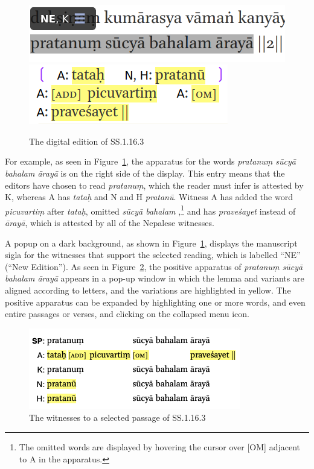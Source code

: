 \begin{figure}[t]
    \centering
    \includegraphics[draft=false,width=.5\textwidth]{media/SS.1.16.3c}
    \quad
    \includegraphics[draft=false,width=.35\textwidth]{media/SS.1.16.3d}
    \caption{The digital edition of SS.1.16.3}
    \label{SS.1.16}
\end{figure}
For example, as seen in Figure~\ref{SS.1.16}, the apparatus for the words 
\emph{pratanuṃ sūcyā bahalam ārayā} is on the right side of the display. 
This entry means that the editors have chosen to read 
\emph{pratanuṃ}, which the reader must infer is attested by K, whereas A has 
\emph{tataḥ} and N and H \emph{pratanū}. Witness A has added the word 
\emph{picuvartiṃ} after \emph{tataḥ}, omitted \emph{sūcyā bahalam },\footnote{The 
omitted words are displayed by hovering the cursor over [OM] adjacent to A in the 
apparatus.} and has \emph{praveśayet} instead of \emph{ārayā}, which is attested by all 
of the Nepalese witnesses. 

A popup on a dark background, as shown in Figure~\ref{SS.1.16}, displays the
manuscript sigla for the witnesses that support the selected reading, which is
labelled “NE” (“New Edition”). As seen in Figure~\ref{SS.1.16.3}, the positive
apparatus of \emph{pratanuṃ sūcyā bahalam ārayā} appears in a pop-up window in
which the lemma and variants are aligned according to letters, and the variations
are highlighted in yellow. The positive apparatus can be expanded by highlighting
one or more words, and even entire passages or verses, and clicking on the
collapsed menu icon.

\begin{figure}[h]
    \centering
    \includegraphics[draft=false,width=.7\textwidth]{media/SS.1.16b.positive}
    \caption{The witnesses to a selected passage of SS.1.16.3}
    \label{SS.1.16.3}
\end{figure}

